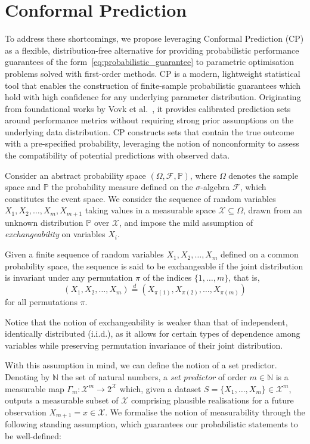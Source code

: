 \section{Conformal Prediction}
\label{sec:conformal_prediction}
To address these shortcomings, we propose leveraging Conformal Prediction (CP) as a flexible, distribution-free alternative for providing probabilistic performance guarantees of the form~\eqref{eq:probabilistic_guarantee} to parametric optimisation problems solved with first-order methods. CP is a modern, lightweight statistical tool that enables the construction of finite-sample probabilistic guarantees which hold with high confidence for any underlying parameter distribution.
Originating from foundational works by Vovk et al.~\cite{vovk2005algorithmic, vovk2020conformal}, it provides calibrated prediction sets around performance metrics without requiring strong prior assumptions on the underlying data distribution. CP constructs sets that contain the true outcome with a pre-specified probability, leveraging the notion of nonconformity to assess the compatibility of potential predictions with observed data.

Consider an abstract probability space $(\Omega, \mathcal{F}, \mathbb{P})$, where $\Omega$ denotes the sample space and $\mathbb{P}$ the probability measure defined on the $\sigma$-algebra $\mathcal{F}$, which constitutes the event space. We consider the sequence of random variables $X_1, X_2, \ldots, X_m, X_{m+1}$ taking values in a measurable space $\mathcal{X} \subseteq \Omega$, drawn from an unknown distribution $\mathbb{P}$ over $\mathcal{X}$, and impose the mild assumption of \emph{exchangeability} on variables $X_i$.

\begin{definition}[Exchangeability]
Given a finite sequence of random variables $X_1, X_2, \ldots, X_m$ defined on a common probability space, the sequence is said to be exchangeable if the joint distribution is invariant under any permutation $\pi$ of the indices $\{1, \ldots, m\}$, that is,
\[
(X_1, X_2, \ldots, X_m) \stackrel{d}{=} (X_{\pi(1)}, X_{\pi(2)}, \ldots, X_{\pi(m)})
\]
for all permutations $\pi$.
\end{definition}

Notice that the notion of exchangeability is weaker than that of independent, identically distributed (i.i.d.), as it allows for certain types of dependence among variables while preserving permutation invariance of their joint distribution.

With this assumption in mind, we can define the notion of a set predictor. Denoting by $\mathbb{N}$ the set of natural numbers, a \emph{set predictor} of order $m \in \mathbb{N}$ is a measurable map $\Gamma_m : \mathcal{X}^m \to 2^\mathcal{X}$ which, given a dataset $S = \{X_1, \ldots, X_m\} \in \mathcal{X}^m$, outputs a measurable subset of $\mathcal{X}$ comprising plausible realisations for a future observation $X_{m+1}  = x \in \mathcal{X}$. We formalise the notion of measurability through the following standing assumption, which guarantees our probabilistic statements to be well-defined:

